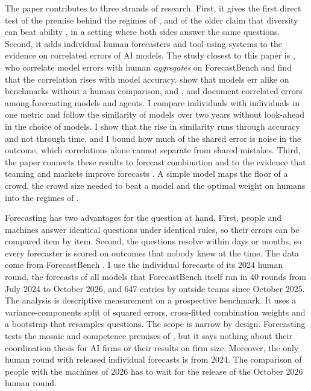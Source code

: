 \documentclass[11pt,a4paper]{article}
\theoremstyle{definition}
\begin{document}
The paper contributes to three strands of research. First, it gives the first direct test of the premise behind the regimes of \citet{imas2026organizing}, and of the older claim that diversity can beat ability \citep{hong2004groups,lamberson2012optimal}, in a setting where both sides answer the same questions. Second, it adds individual human forecasters and tool-using systems to the evidence on correlated errors of AI models. The study closest to this paper is \citet{jeddi2026crowdsourced}, who correlate model errors with human \emph{aggregates} on ForecastBench and find that the correlation rises with model accuracy. \citet{kim2025correlated} show that models err alike on benchmarks without a human comparison, and \citet{spiro2026oracle}, \citet{aitchison2026diversity} and \citet{begin2026preference} document correlated errors among forecasting models and agents. I compare individuals with individuals in one metric and follow the similarity of models over two years without look-ahead in the choice of models. I show that the rise in similarity runs through accuracy and not through time, and I bound how much of the shared error is noise in the outcome, which correlations alone cannot separate from shared mistakes. Third, the paper connects these results to forecast combination \citep{bates1969combination,clemen1989combining} and to the evidence that teaming and markets improve forecasts \citep{mellers2014psychological,wolfers2004prediction,atanasov2017distilling}. A simple model maps the floor of a crowd, the crowd size needed to beat a model and the optimal weight on humans into the regimes of \citet{imas2026organizing}.

Forecasting has two advantages for the question at hand. First, people and machines answer identical questions under identical rules, so their errors can be compared item by item. Second, the questions resolve within days or months, so every forecaster is scored on outcomes that nobody knew at the time. The data come from ForecastBench \citep{karger2025forecastbench}. I use the individual forecasts of its 2024 human round, the forecasts of all models that ForecastBench itself ran in 40 rounds from July 2024 to October 2026, and 647 entries by outside teams since October 2025. The analysis is descriptive measurement on a prospective benchmark. It uses a variance-components split of squared errors, cross-fitted combination weights and a bootstrap that resamples questions. The scope is narrow by design. Forecasting tests the mosaic and competence premises of \citet{imas2026organizing}, but it says nothing about their coordination thesis for AI firms or their results on firm size. Moreover, the only human round with released individual forecasts is from 2024. The comparison of people with the machines of 2026 has to wait for the release of the October 2026 human round.
\end{document}
